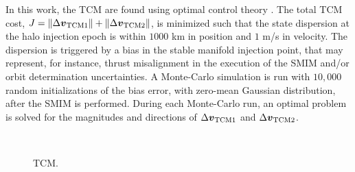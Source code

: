 In this work, the {TCM} are found using optimal control theory \cite{serban2002haloTCM}. The total {TCM} cost, $J = \|\Delta\boldsymbol{v}_{\textrm{TCM1}}\|+\|\Delta\boldsymbol{v}_{\textrm{TCM2}}\|$, is minimized such that the state dispersion at the halo injection epoch is within $1000$ km in position and $1$ m/s in velocity. The dispersion is triggered by a bias in the stable manifold injection point, that may represent, for instance, thrust misalignment in the execution of the {SMIM} and/or orbit determination uncertainties. A Monte-Carlo simulation is run with $10,000$ random initializations of the bias error, with zero-mean Gaussian distribution, after the {SMIM} is performed. During each Monte-Carlo run, an optimal problem is solved for the magnitudes and directions of $\Delta\boldsymbol{v}_{\textrm{TCM1}}$ and $\Delta\boldsymbol{v}_{\textrm{TCM2}}$.
%
\begin{figure*}[t!]
	\centering
	\hfill
	\hfill
	\hfill
	\hfill
	\hfill \\
	\hfill
	\hfill
	\hfill
	\caption[Trajectory correction maneuvers.]{{TCM}.}
	\label{fig:TCMsData}
\end{figure*}
%

